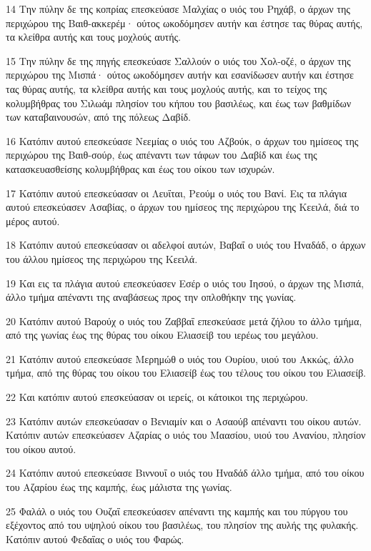 \par 14 Την πύλην δε της κοπρίας επεσκεύασε Μαλχίας ο υιός του Ρηχάβ, ο άρχων της περιχώρου της Βαιθ-ακκερέμ· ούτος ωκοδόμησεν αυτήν και έστησε τας θύρας αυτής, τα κλείθρα αυτής και τους μοχλούς αυτής.
\par 15 Την πύλην δε της πηγής επεσκεύασε Σαλλούν ο υιός του Χολ-οζέ, ο άρχων της περιχώρου της Μισπά· ούτος ωκοδόμησεν αυτήν και εσανίδωσεν αυτήν και έστησε τας θύρας αυτής, τα κλείθρα αυτής και τους μοχλούς αυτής, και το τείχος της κολυμβήθρας του Σιλωάμ πλησίον του κήπου του βασιλέως, και έως των βαθμίδων των καταβαινουσών, από της πόλεως Δαβίδ.
\par 16 Κατόπιν αυτού επεσκεύασε Νεεμίας ο υιός του Αζβούκ, ο άρχων του ημίσεος της περιχώρου της Βαιθ-σούρ, έως απέναντι των τάφων του Δαβίδ και έως της κατασκευασθείσης κολυμβήθρας και έως του οίκου των ισχυρών.
\par 17 Κατόπιν αυτού επεσκεύασαν οι Λευΐται, Ρεούμ ο υιός του Βανί. Εις τα πλάγια αυτού επεσκεύασεν Ασαβίας, ο άρχων του ημίσεος της περιχώρου της Κεειλά, διά το μέρος αυτού.
\par 18 Κατόπιν αυτού επεσκεύασαν οι αδελφοί αυτών, Βαβαΐ ο υιός του Ηναδάδ, ο άρχων του άλλου ημίσεος της περιχώρου της Κεειλά.
\par 19 Και εις τα πλάγια αυτού επεσκεύασεν Εσέρ ο υιός του Ιησού, ο άρχων της Μισπά, άλλο τμήμα απέναντι της αναβάσεως προς την οπλοθήκην της γωνίας.
\par 20 Κατόπιν αυτού Βαρούχ ο υιός του Ζαββαΐ επεσκεύασε μετά ζήλου το άλλο τμήμα, από της γωνίας έως της θύρας του οίκου Ελιασείβ του ιερέως του μεγάλου.
\par 21 Κατόπιν αυτού επεσκεύασε Μερημώθ ο υιός του Ουρίου, υιού του Ακκώς, άλλο τμήμα, από της θύρας του οίκου του Ελιασείβ έως του τέλους του οίκου του Ελιασείβ.
\par 22 Και κατόπιν αυτού επεσκεύασαν οι ιερείς, οι κάτοικοι της περιχώρου.
\par 23 Κατόπιν αυτών επεσκεύασαν ο Βενιαμίν και ο Ασαούβ απέναντι του οίκου αυτών. Κατόπιν αυτών επεσκεύασεν Αζαρίας ο υιός του Μαασίου, υιού του Ανανίου, πλησίον του οίκου αυτού.
\par 24 Κατόπιν αυτού επεσκεύασε Βιννουΐ ο υιός του Ηναδάδ άλλο τμήμα, από του οίκου του Αζαρίου έως της καμπής, έως μάλιστα της γωνίας.
\par 25 Φαλάλ ο υιός του Ουζαΐ επεσκεύασεν απέναντι της καμπής και του πύργου του εξέχοντος από του υψηλού οίκου του βασιλέως, του πλησίον της αυλής της φυλακής. Κατόπιν αυτού Φεδαΐας ο υιός του Φαρώς.
